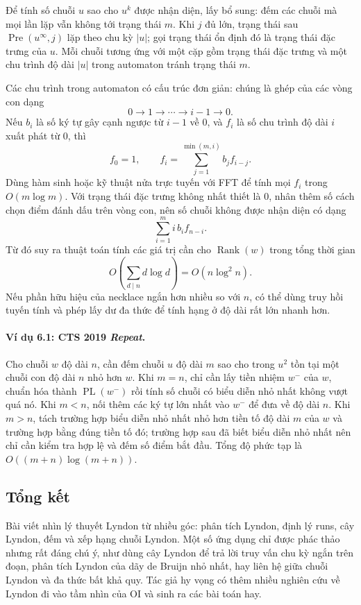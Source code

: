 \documentclass[11pt]{article}
\begin{document}
Để tính số chuỗi $u$ sao cho $u^k$ được nhận diện, lấy bổ sung: đếm các chuỗi
mà mọi lần lặp vẫn không tới trạng thái $m$. Khi $j$ đủ lớn, trạng thái sau
$\operatorname{Pre}(u^\infty,j)$ lặp theo chu kỳ $|u|$; gọi trạng thái ổn định
đó là trạng thái đặc trưng của $u$. Mỗi chuỗi tương ứng với một cặp gồm trạng
thái đặc trưng và một chu trình độ dài $|u|$ trong automaton tránh trạng thái
$m$.

Các chu trình trong automaton có cấu trúc đơn giản: chúng là ghép của các vòng
con dạng
\[
  0\to 1\to \cdots\to i-1\to 0.
\]
Nếu $b_i$ là số ký tự gây cạnh ngược từ $i-1$ về $0$, và $f_i$ là số chu trình
độ dài $i$ xuất phát từ $0$, thì
\[
  f_0=1,\qquad
  f_i=\sum_{j=1}^{\min(m,i)} b_j f_{i-j}.
\]
Dùng hàm sinh hoặc kỹ thuật nửa trực tuyến với FFT để tính mọi $f_i$ trong
$O(m\log m)$. Với trạng thái đặc trưng không nhất thiết là $0$, nhân thêm số
cách chọn điểm đánh dấu trên vòng con, nên số chuỗi không được nhận diện có dạng
\[
  \sum_{i=1}^{m} i\,b_i f_{n-i}.
\]
Từ đó suy ra thuật toán tính các giá trị cần cho $\operatorname{Rank}(w)$ trong
tổng thời gian
\[
  O\!\left(\sum_{d\mid n} d\log d\right)=O(n\log^2 n).
\]
Nếu phần hữu hiệu của necklace ngắn hơn nhiều so với $n$, có thể dùng truy hồi
tuyến tính và phép lấy dư đa thức để tính hạng ở độ dài rất lớn nhanh hơn.

\paragraph{Ví dụ 6.1: CTS 2019 \emph{Repeat}.}
Cho chuỗi $w$ độ dài $n$, cần đếm chuỗi $u$ độ dài $m$ sao cho trong $u^2$ tồn
tại một chuỗi con độ dài $n$ nhỏ hơn $w$. Khi $m=n$, chỉ cần lấy tiền nhiệm
$w^-$ của $w$, chuẩn hóa thành $\operatorname{PL}(w^-)$ rồi tính số chuỗi có
biểu diễn nhỏ nhất không vượt quá nó. Khi $m<n$, nối thêm các ký tự lớn nhất vào
$w^-$ để đưa về độ dài $n$. Khi $m>n$, tách trường hợp biểu diễn nhỏ nhất nhỏ hơn
tiền tố độ dài $m$ của $w$ và trường hợp bằng đúng tiền tố đó; trường hợp sau đã
biết biểu diễn nhỏ nhất nên chỉ cần kiểm tra hợp lệ và đếm số điểm bắt đầu. Tổng
độ phức tạp là $O((m+n)\log(m+n))$.

\subsection{Tổng kết}

Bài viết nhìn lý thuyết Lyndon từ nhiều góc: phân tích Lyndon, định lý runs,
cây Lyndon, đếm và xếp hạng chuỗi Lyndon. Một số ứng dụng chỉ được phác thảo
nhưng rất đáng chú ý, như dùng cây Lyndon để trả lời truy vấn chu kỳ ngắn trên
đoạn, phân tích Lyndon của dãy de Bruijn nhỏ nhất, hay liên hệ giữa chuỗi Lyndon
và đa thức bất khả quy. Tác giả hy vọng có thêm nhiều nghiên cứu về Lyndon đi
vào tầm nhìn của OI và sinh ra các bài toán hay.
\end{document}
